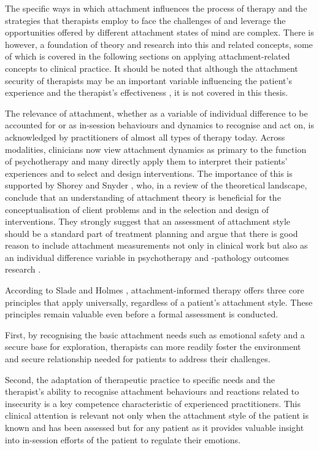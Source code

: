 \documentclass[12pt]{report}
\begin{document}
The specific ways in which attachment influences the process of therapy and the strategies that therapists employ to face the challenges of and leverage the opportunities offered by different attachment states of mind are complex.
There is however, a foundation of theory and research into this and related concepts, some of which is covered in the following sections on applying attachment-related concepts to clinical practice.
It should be noted that although the attachment security of therapists may be an important variable influencing the patient's experience and the therapist's effectiveness \cite{Mikulincer2013, Daniel2006, Dozier1994, Cologon2017, Talia2020}, it is not covered in this thesis.

The relevance of attachment, whether as a variable of individual difference to be accounted for or as in-session behaviours and dynamics to recognise and act on, is acknowledged by practitioners of almost all types of therapy today.
Across modalities, clinicians now view attachment dynamics as primary to the function of psychotherapy and many directly apply them to interpret their patients' experiences and to select and design interventions.
The importance of this is supported by Shorey and Snyder \citeyear{Shorey2006}, who, in a review of the theoretical landscape, conclude that an understanding of attachment theory is beneficial for the conceptualisation of client problems and in the selection and design of interventions.
They strongly suggest that an assessment of attachment style should be a standard part of treatment planning and argue that there is good reason to include attachment measurements not only in clinical work but also as an individual difference variable in psychotherapy and -pathology outcomes research \cite{Shorey2006}.

According to Slade and Holmes \citeyear{Slade2019}, attachment-informed therapy offers three core principles that apply universally, regardless of a patient's attachment style.
These principles remain valuable even before a formal assessment is conducted.

First, by recognising the basic attachment needs such as emotional safety and a secure base for exploration, therapists can more readily foster the environment and secure relationship needed for patients to address their challenges.

Second, the adaptation of therapeutic practice to specific needs and the therapist's ability to recognise attachment behaviours and reactions related to insecurity is a key competence characteristic of experienced practitioners. This clinical attention is relevant not only when the attachment style of the patient is known and has been assessed but for any patient as it provides valuable insight into in-session efforts of the patient to regulate their emotions.
\end{document}

